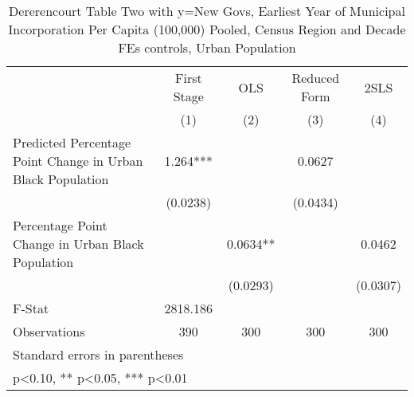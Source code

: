 \begin{table}[htbp]\centering
\def\sym#1{\ifmmode^{#1}\else\(^{#1}\)\fi}
\caption{Dererencourt Table Two with y=New Govs, Earliest Year of Municipal Incorporation Per Capita (100,000) Pooled, Census Region and Decade FEs controls, Urban Population}
\begin{tabular}{l*{4}{c}}
\toprule
                    & First Stage   &         OLS   &Reduced Form   &        2SLS   \\
                    &\multicolumn{1}{c}{(1)}   &\multicolumn{1}{c}{(2)}   &\multicolumn{1}{c}{(3)}   &\multicolumn{1}{c}{(4)}   \\
\midrule
Predicted Percentage Point Change in Urban Black Population&       1.264***&               &      0.0627   &               \\
                    &    (0.0238)   &               &    (0.0434)   &               \\
\addlinespace
Percentage Point Change in Urban Black Population&               &      0.0634** &               &      0.0462   \\
                    &               &    (0.0293)   &               &    (0.0307)   \\
\midrule
F-Stat              &    2818.186   &               &               &               \\
Observations        &         390   &         300   &         300   &         300   \\
\bottomrule
\multicolumn{5}{l}{\footnotesize Standard errors in parentheses}\\
\multicolumn{5}{l}{\footnotesize * p<0.10, ** p<0.05, *** p<0.01}\\
\end{tabular}
\end{table}
